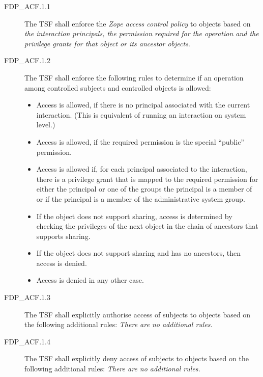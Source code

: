 \documentclass[12pt,english]{scrbook}
\begin{document}
\begin{description}
\item[FDP{\_}ACF.1.1]

The TSF shall enforce the \emph{Zope access control policy} to objects
based on \emph{the interaction principals, the permission required for
the operation and the privilege grants for that
object or its ancestor objects}.

\item[FDP{\_}ACF.1.2]

The TSF shall enforce the following rules to determine
if an operation among controlled subjects and controlled objects is
allowed:

\begin{itemize}

\item Access is allowed, if there is no principal associated with the current
interaction. (This is equivalent of running an interaction on system level.)

\item Access is allowed, if the required permission is the special ``public''
permission.

\item Access is allowed if, for each principal associated to the interaction,
there is a privilege grant that is mapped to the required permission for either
the principal or one of the groups the principal is a member of or if the principal is a member
of the administrative system group.

\item If the object does not support sharing, access is determined by checking
the privileges of the next object in the chain of ancestors that supports
sharing. 

\item If the object does not support sharing and has no ancestors, then access
is denied.

\item Access is denied in any other case.

\end{itemize}

\item[FDP{\_}ACF.1.3]

The TSF shall explicitly authorise access of subjects to objects based on the
following additional rules: \emph{There are no additional rules.}


\item[FDP{\_}ACF.1.4]

The TSF shall explicitly deny access of subjects to objects based on the
following additional rules: \emph{There are no additional rules.}


\end{description}
\end{document}

